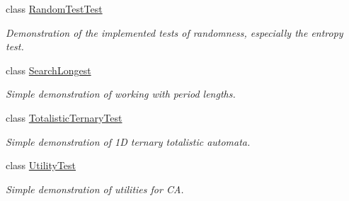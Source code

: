 \begin{DoxyCompactItemize}
class \hyperlink{class_testing_1_1_random_test_test}{Random\+Test\+Test}
\begin{DoxyCompactList}\small\item\em Demonstration of the implemented tests of randomness, especially the entropy test. \end{DoxyCompactList}\item 
class \hyperlink{class_testing_1_1_search_longest}{Search\+Longest}
\begin{DoxyCompactList}\small\item\em Simple demonstration of working with period lengths. \end{DoxyCompactList}\item 
class \hyperlink{class_testing_1_1_totalistic_ternary_test}{Totalistic\+Ternary\+Test}
\begin{DoxyCompactList}\small\item\em Simple demonstration of 1\+D ternary totalistic automata. \end{DoxyCompactList}\item 
class \hyperlink{class_testing_1_1_utility_test}{Utility\+Test}
\begin{DoxyCompactList}\small\item\em Simple demonstration of utilities for C\+A. \end{DoxyCompactList}\end{DoxyCompactItemize}
